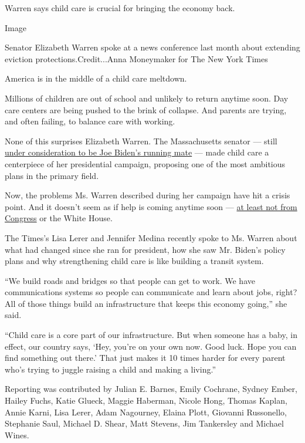 Warren says child care is crucial for bringing the economy back.

Image

Senator Elizabeth Warren spoke at a news conference last month about
extending eviction protections.Credit...Anna Moneymaker for The New York
Times

America is in the middle of a child care meltdown.

Millions of children are out of school and unlikely to return anytime
soon. Day care centers are being pushed to the brink of collapse. And
parents are trying, and often failing, to balance care with working.

None of this surprises Elizabeth Warren. The Massachusetts senator ---
still
\href{https://www.nytimes3xbfgragh.onion/article/biden-vice-president-2020.html}{under
consideration to be Joe Biden's running mate} --- made child care a
centerpiece of her presidential campaign, proposing one of the most
ambitious plans in the primary field.

Now, the problems Ms. Warren described during her campaign have hit a
crisis point. And it doesn't seem as if help is coming anytime soon ---
\href{https://www.nytimes3xbfgragh.onion/2020/08/06/us/politics/congress-schools-coronavirus.html}{at
least not from Congress} or the White House.

The Times's Lisa Lerer and Jennifer Medina recently spoke to Ms. Warren
about what had changed since she ran for president, how she saw Mr.
Biden's policy plans and why strengthening child care is like building a
transit system.

``We build roads and bridges so that people can get to work. We have
communications systems so people can communicate and learn about jobs,
right? All of those things build an infrastructure that keeps this
economy going,'' she said.

``Child care is a core part of our infrastructure. But when someone has
a baby, in effect, our country says, `Hey, you're on your own now. Good
luck. Hope you can find something out there.' That just makes it 10
times harder for every parent who's trying to juggle raising a child and
making a living.''

Reporting was contributed by Julian E. Barnes, Emily Cochrane, Sydney
Ember, Hailey Fuchs, Katie Glueck, Maggie Haberman, Nicole Hong, Thomas
Kaplan, Annie Karni, Lisa Lerer, Adam Nagourney, Elaina Plott, Giovanni
Russonello, Stephanie Saul, Michael D. Shear, Matt Stevens, Jim
Tankersley and Michael Wines.

